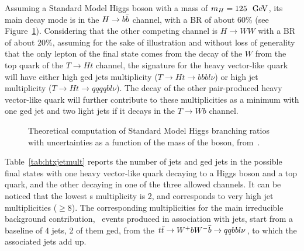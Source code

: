 Assuming a Standard Model Higgs boson with a mass of  $m_H= 125~\gev$,
its main decay mode is in the $H\to \bbbar$ channel, with a BR of about
60\% (see Figure~\ref{fig:HBR}). Considering that the other competing
channel is $H\to WW$ with a BR of about 20\%, assuming for the sake of 
illustration and without loss of generality that the only lepton of the
final state comes from the decay of the $W$ from the top quark of the
$T\to Ht$ channel, the signature for the heavy vector-like quark will
have either high \btag ged jets multiplicity ($T\to Ht\to bbbl\nu $)
or high jet multiplicity ($T\to Ht\to qqqqbl\nu $). The decay of the
other pair-produced heavy vector-like quark will further contribute
to these multiplicities as a minimum with one \btag ged jet and two
light jets if it decays in the $T\to Wb$ channel.
\begin{figure}[htb]\begin{center}
	\caption{Theoretical computation of Standard Model Higgs 
        branching ratios with uncertainties as a function of the 
        mass of the boson, from~\cite{Denner:2011mq}.\label{fig:HBR}}
\end{center}\end{figure}
Table~\ref{tab:htxjetmult} reports the number of jets and \btag ged jets
in the possible final states with one heavy vector-like quark decaying
to a Higgs boson and a top quark, and the other decaying in one
of the three allowed channels. It can be noticed that the lowest
\bjet s multiplicity is 2, and corresponds to very high jet multiplicities
($\geq 8$). 
The corresponding multiplicities for the main irreducible background 
contribution, \ttbar\ events produced in association with jets,
start from a baseline of 4 jets, 2 of them \btag ged, from the
$\ttbar\to W^+bW^-\bar{b}\to qqbbl\nu$, to which the associated 
jets add up. 

